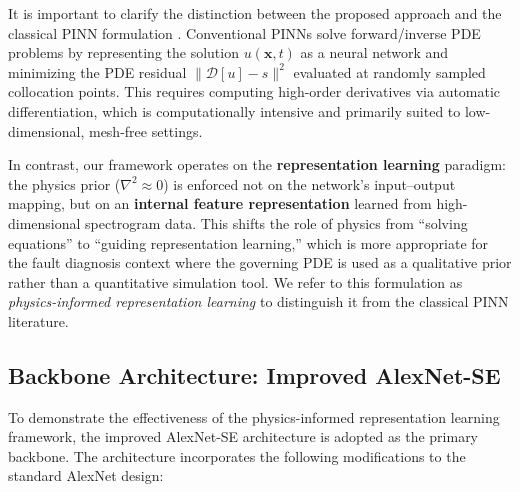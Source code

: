 \documentclass[twocolumn,iicol,pdflatex,sn-mathphys-num]{sn-jnl}%
\begin{document}
It is important to clarify the distinction between the proposed approach and the classical PINN formulation \cite{9903391}. Conventional PINNs solve forward/inverse PDE problems by representing the solution $u(\mathbf{x}, t)$ as a neural network and minimizing the PDE residual $\|\mathcal{D}[u] - s\|^2$ evaluated at randomly sampled collocation points. This requires computing high-order derivatives via automatic differentiation, which is computationally intensive and primarily suited to low-dimensional, mesh-free settings.

In contrast, our framework operates on the \textbf{representation learning} paradigm: the physics prior ($\nabla^2 \approx 0$) is enforced not on the network's input--output mapping, but on an \textbf{internal feature representation} learned from high-dimensional spectrogram data. This shifts the role of physics from ``solving equations'' to ``guiding representation learning,'' which is more appropriate for the fault diagnosis context where the governing PDE is used as a qualitative prior rather than a quantitative simulation tool. We refer to this formulation as \textit{physics-informed representation learning} to distinguish it from the classical PINN literature.

\subsection{Backbone Architecture: Improved AlexNet-SE}

To demonstrate the effectiveness of the physics-informed representation learning framework, the improved AlexNet-SE architecture is adopted as the primary backbone. The architecture incorporates the following modifications to the standard AlexNet design:
\end{document}
